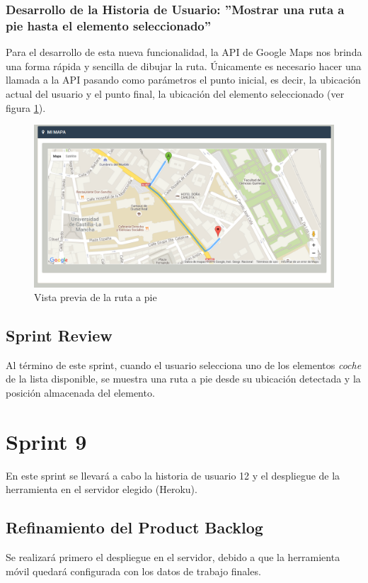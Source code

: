 	\subsubsection{Desarrollo de la Historia de Usuario: ''Mostrar una ruta a pie hasta el elemento seleccionado''}
	Para el desarrollo de esta nueva funcionalidad, la API de Google Maps nos brinda una forma rápida y sencilla de dibujar la ruta. Únicamente es necesario hacer una llamada a la API pasando como parámetros el punto inicial, es decir, la ubicación actual del usuario y el punto final, la ubicación del elemento seleccionado (ver figura \ref{fig:ruta}).
	
	\begin{figure}[H]
		\centering
		\includegraphics[width=15cm, fbox={\fboxrule} 4mm]{images/05-resultados/24-ruta.png}
		\caption{Vista previa de la ruta a pie}
		\label{fig:ruta}
	\end{figure}
			
	\subsection{Sprint Review}
	Al término de este sprint, cuando el usuario selecciona uno de los elementos \textit{coche} de la lista disponible, se muestra una ruta a pie desde su ubicación detectada y la posición almacenada del elemento.
	
\section{Sprint 9}
En este sprint se llevará a cabo la historia de usuario 12 y el despliegue de la herramienta en el servidor elegido (Heroku).

	\subsection{Refinamiento del Product Backlog}
	Se realizará primero el despliegue en el servidor, debido a que la herramienta móvil quedará configurada con los datos de trabajo finales.

